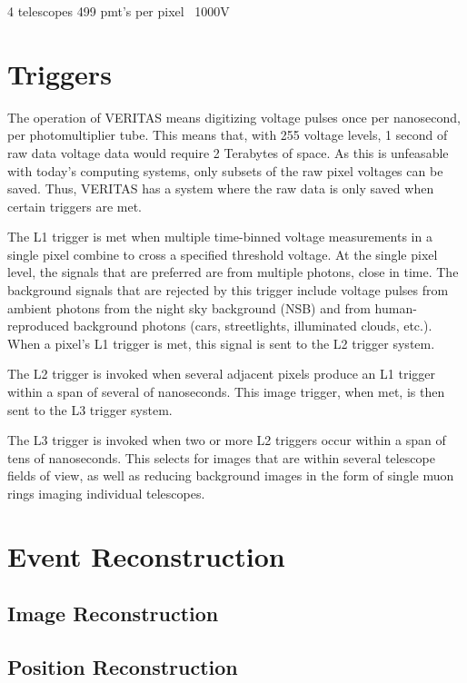 4 telescopes
499 pmt's per pixel
~1000V

\section{Triggers}\label{sec:trig}

The operation of VERITAS means digitizing voltage pulses once per nanosecond, per photomultiplier tube.
This means that, with 255 voltage levels, 1 second of raw data voltage data would require 2 Terabytes of space.
As this is unfeasable with today's computing systems, only subsets of the raw pixel voltages can be saved.
Thus, VERITAS has a system where the raw data is only saved when certain triggers are met.

The L1 trigger is met when multiple time-binned voltage measurements in a single pixel combine to cross a specified threshold voltage.
At the single pixel level, the signals that are preferred are from multiple photons, close in time.
The background signals that are rejected by this trigger include voltage pulses from ambient photons from the night sky background (NSB) and from human-reproduced background photons (cars, streetlights, illuminated clouds, etc.).
When a pixel's L1 trigger is met, this signal is sent to the L2 trigger system.

The L2 trigger is invoked when several adjacent pixels produce an L1 trigger within a span of several of nanoseconds.
This image trigger, when met, is then sent to the L3 trigger system.

The L3 trigger is invoked when two or more L2 triggers occur within a span of tens of nanoseconds.
This selects for images that are within several telescope fields of view, as well as reducing background images in the form of single muon rings imaging individual telescopes.

\section{Event Reconstruction}\label{sec:recon}

\subsection{Image Reconstruction}\label{subsec:imgrecon}

\subsection{Position Reconstruction}\label{subsec:posrecon}

